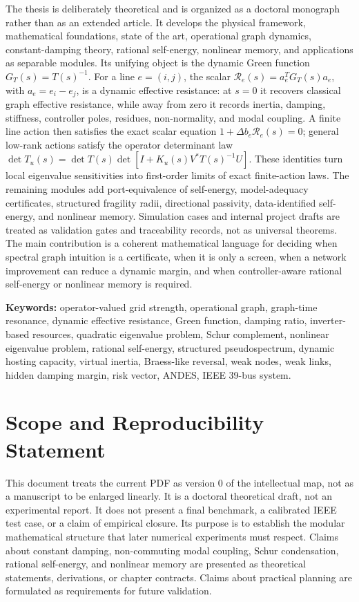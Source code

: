 \documentclass[11pt,letterpaper,oneside]{book}
\begin{document}
The thesis is deliberately theoretical and is organized as a doctoral
monograph rather than as an extended article. It develops the physical
framework, mathematical foundations, state of the art, operational graph
dynamics, constant-damping theory, rational self-energy, nonlinear memory, and
applications as separable modules.
Its unifying object is the
dynamic Green function \(G_T(s)=T(s)^{-1}\). For a line \(e=(i,j)\), the scalar
\(\mathcal R_e(s)=a_e^TG_T(s)a_e\), with \(a_e=e_i-e_j\), is a dynamic
effective resistance: at \(s=0\) it recovers classical graph effective
resistance, while away from zero it records inertia, damping, stiffness,
controller poles, residues, non-normality, and modal coupling. A finite line
action then satisfies the exact scalar equation
\(1+\Delta b_e\mathcal R_e(s)=0\); general low-rank actions satisfy the
operator determinant law
\(\det T_u(s)=\det T(s)\det[I+K_u(s)V^*T(s)^{-1}U]\). These identities turn
local eigenvalue sensitivities into first-order limits of exact finite-action
laws. The remaining modules add port-equivalence of self-energy,
model-adequacy certificates, structured fragility radii, directional
passivity, data-identified self-energy, and nonlinear memory. Simulation cases
and internal project drafts are treated as validation gates and traceability
records, not as universal theorems. The main contribution is a coherent
mathematical language for deciding when spectral graph intuition is a
certificate, when it is only a screen, when a network improvement can reduce a
dynamic margin, and when controller-aware rational self-energy or nonlinear
memory is required.

\textbf{Keywords:} operator-valued grid strength, operational graph,
graph-time resonance, dynamic effective resistance, Green function, damping
ratio, inverter-based resources, quadratic eigenvalue problem, Schur
complement, nonlinear eigenvalue problem, rational self-energy, structured
pseudospectrum, dynamic hosting capacity, virtual inertia, Braess-like
reversal, weak nodes, weak links, hidden damping margin, risk vector, ANDES,
IEEE 39-bus system.

\chapter*{Scope and Reproducibility Statement}
This document treats the current PDF as version 0 of the intellectual map, not
as a manuscript to be enlarged linearly. It is a doctoral theoretical draft,
not an experimental report. It does not present a final benchmark, a calibrated
IEEE test case, or a claim of empirical closure. Its purpose is to establish
the modular mathematical structure that later numerical experiments must
respect. Claims about constant damping, non-commuting modal coupling, Schur
condensation, rational self-energy, and nonlinear memory are presented as
theoretical statements, derivations, or chapter contracts. Claims about
practical planning are formulated as requirements for future validation.
\end{document}

